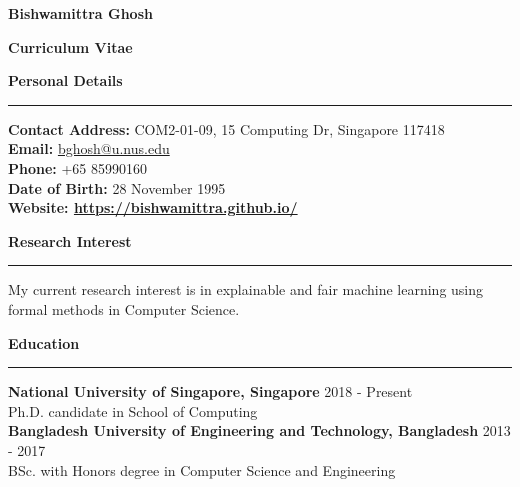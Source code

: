 \documentclass[a4paper,11pt,final]{article}
\newcommand{\Sep}{\vspace{1.5em}}
\newcommand{\SmallSep}{\vspace{0.5em}}
\begin{document}
	
	\begin{center}
		\Huge \textbf{Bishwamittra Ghosh}\\
		\vspace{0.2em}	
		\Large \centerline{ \textbf{Curriculum Vitae}}
	\end{center}
	
	\Sep
	\Large { \textbf{Personal Details}}\\
	\noindent\rule{\textwidth}{1pt}
	\normalsize 
	 \textbf{Contact Address:} COM2-01-09, 15 Computing Dr, Singapore 117418\\
	\textbf{Email:} \url{bghosh@u.nus.edu}  \\
	\textbf{Phone:} +65 85990160\\
	\textbf{Date of Birth:}  28  November  1995 \\
	\textbf{Website: \url{https://bishwamittra.github.io/}} 

	\Sep	
\Large { \textbf{Research Interest}}\\
\noindent\rule{\textwidth}{1pt}
\normalsize
My current research interest is in explainable and fair machine learning using formal methods in Computer Science. 
	
	\Sep	
\Large { \textbf{Education}}\\
\noindent\rule{\textwidth}{1pt}
\normalsize
\textbf{National University of Singapore, Singapore}
\hspace*{\fill} 2018  - Present\\
Ph.D. candidate in  School of Computing\\

\SmallSep
\textbf{Bangladesh University of Engineering and Technology, Bangladesh}
\hspace*{\fill} 2013  -  2017\\
BSc. with Honors degree in Computer Science and Engineering\\
\end{document}
